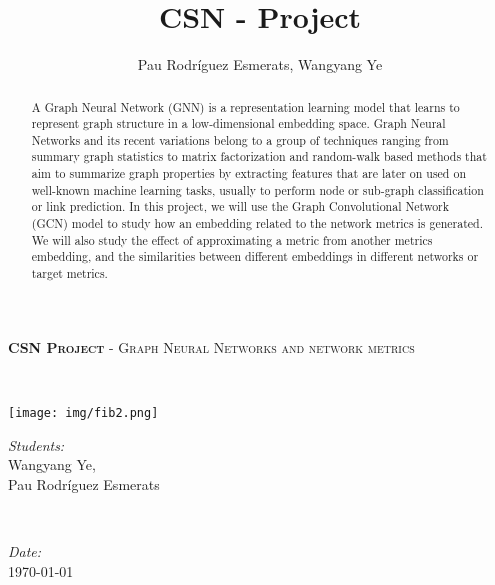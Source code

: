 \documentclass[a4paper]{article}
\title{CSN - Project}
\author{Pau Rodríguez Esmerats, Wangyang Ye }
\begin{document}
%



\begin{minipage}{0.6\textwidth}
\begin{flushleft} \large
\textsc{\textbf{\Large CSN Project}} -  \textsc{\large Graph Neural Networks and network metrics }\\[0.5cm] %
\end{flushleft}
\end{minipage}
~
\begin{minipage}{0.4\textwidth}
\begin{flushright} \large
\texttt{[image: img/fib2.png]}\\[0.3cm]
\end{flushright}
\end{minipage}
 


\begin{minipage}{0.7\textwidth}
\begin{flushleft} 
\emph{Students:}\\
Wangyang Ye,\\ Pau Rodríguez Esmerats  %
\end{flushleft}
\end{minipage}
~
\begin{minipage}{0.3\textwidth}
\begin{flushleft}
\emph{Date:}\\
\today
\end{flushleft}
\end{minipage}\\[0.5cm]

\begin{abstract}
\noindent A Graph Neural Network (GNN) is a representation learning model that learns to represent graph structure in a low-dimensional embedding space.
Graph Neural Networks and its recent variations belong to a group of techniques ranging from summary graph statistics to matrix factorization and random-walk based methods that aim to summarize graph properties by extracting features that are later on used on well-known machine learning tasks, usually to perform node or sub-graph classification or link prediction.
In this project, we will use the Graph Convolutional Network (GCN) model to study how an embedding related to the network metrics is generated. We will also study the effect of approximating a metric from another metrics embedding, and the similarities between different embeddings in different networks or target metrics.

\end{abstract}
\end{document}
